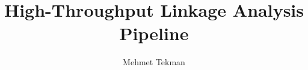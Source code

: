 \documentclass[11pt]{report} %
\author{Mehmet Tekman}
\title{High-Throughput Linkage Analysis Pipeline}
\begin{document}
\maketitle 

\begin{spacing}{1}
\tableofcontents
\end{spacing}









\end{document}

